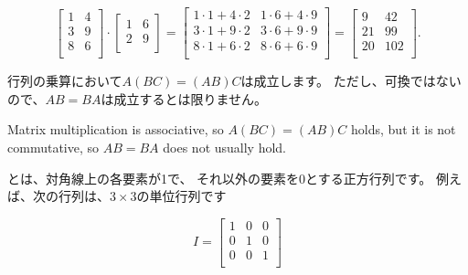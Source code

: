 \begin{center}
\end{center}

\[
 \begin{bmatrix}
  1 & 4 \\
  3 & 9 \\
  8 & 6 \\
 \end{bmatrix}
\cdot
 \begin{bmatrix}
  1 & 6 \\
  2 & 9 \\
 \end{bmatrix}
=
 \begin{bmatrix}
  1 \cdot 1 + 4 \cdot 2 & 1 \cdot 6 + 4 \cdot 9 \\
  3 \cdot 1 + 9 \cdot 2 & 3 \cdot 6 + 9 \cdot 9 \\
  8 \cdot 1 + 6 \cdot 2 & 8 \cdot 6 + 6 \cdot 9 \\
 \end{bmatrix}
=
 \begin{bmatrix}
  9 & 42 \\
  21 & 99 \\
  20 & 102 \\
 \end{bmatrix}.
\]

行列の乗算において$A(BC)=(AB)C$は成立します。
ただし、可換ではないので、$AB=BA$は成立するとは限りません。

Matrix multiplication is associative,
so $A(BC)=(AB)C$ holds,
but it is not commutative,
so $AB = BA$ does not usually hold.


とは、対角線上の各要素が1で、
それ以外の要素を0とする正方行列です。
例えば、次の行列は、$3 \times 3$の単位行列です

\[
 I = \begin{bmatrix}
  1 & 0 & 0 \\
  0 & 1 & 0 \\
  0 & 0 & 1 \\
 \end{bmatrix}
\]

